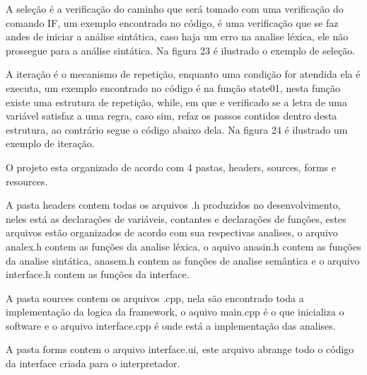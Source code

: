 \documentclass[12pt,oneside,a4paper,chapter=TITLE,section=TITLE,sumario=tradicional]{abntex2}
\begin{document}
\begin{figure}[htb]
\end{figure}

A seleção é a verificação do caminho que será tomado com uma verificação do comando IF\cite{ivan2003}, um exemplo encontrado no código, é uma verificação que se faz andes de iniciar a análise sintática, caso haja um erro na analise léxica, ele não prossegue para a análise sintática. Na figura 23 é ilustrado o exemplo de seleção.

\begin{figure}[htb]
\end{figure}

A iteração é o mecanismo de repetição, enquanto uma condição for atendida ela é executa\cite{ivan2003}, um exemplo encontrado no código é na função state01, nesta função existe uma estrutura de repetição, while, em que e verificado se a letra de uma variável satisfaz a uma regra, caso sim, refaz os passos contidos dentro desta estrutura, ao contrário segue o código abaixo dela. Na figura 24 é ilustrado um exemplo de iteração.

\begin{figure}[htb]
\end{figure}

O projeto esta organizado de acordo com 4 pastas, headers, sources, forms e resources.

A pasta headers contem todas os arquivos .h produzidos no desenvolvimento, neles está as declarações de variáveis, contantes e declarações de funções, estes arquivos estão organizados de acordo com sua respectivas analises, o arquivo analex.h contem as funções da analise léxica, o aquivo anasin.h contem as funções da analise sintática, anasem.h contem as funções de analise semântica e o arquivo interface.h contem as funções da interface.

A pasta sources contem os arquivos .cpp, nela são encontrado toda a implementação da logica da framework, o aquivo main.cpp é o que inicializa o software e o arquivo interface.cpp é onde está a implementação das analises.

A pasta forms contem o arquivo interface.ui, este arquivo abrange todo o código da interface criada para o interpretador.
\end{document}
